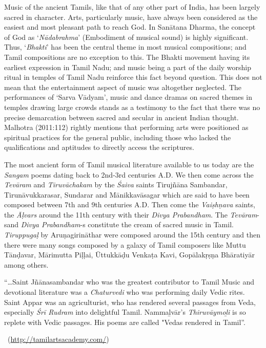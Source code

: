 Music of the ancient Tamils, like that of any other part of India, has been largely sacred in character. Arts, particularly music, have always been considered as the easiest and most pleasant path to reach God. In Sanātana Dharma, the concept of God as ‘\textit{Nādabrahma}’ (Embodiment of musical sound) is highly significant. Thus, ‘\textit{Bhakti}’ has been the central theme in most musical compositions; and Tamil compositions are no exception to this. The Bhakti movement having its earliest expression in Tamil Nadu; and music being a part of the daily worship ritual in temples of Tamil Nadu reinforce this fact beyond question. This does not mean that the entertainment aspect of music was altogether neglected. The performances of ‘Sarva Vādyam’, music and dance dramas on sacred themes in temples drawing large crowds stands as a testimony to the fact that there was no precise demarcation between sacred and secular in ancient Indian thought. Malhotra (2011:112) rightly mentions that performing arts were positioned as spiritual practices for the general public, including those who lacked the qualifications and aptitudes to directly access the scriptures. 

The most ancient form of Tamil musical literature available to us today are the \textit{Sangam} poems dating back to 2nd-3rd centuries A.D. We then come across the \textit{Tevāram} and \textit{Tiruvāchakam} by the \textit{Śaiva} saints Tirujñāna Sambandar, Tirunāvukkarasar, Sundarar and Mānikkavāsagar which are said to have been composed between 7th and 9th centuries A.D. Then come the \textit{Vaiṣhṇava} saints, the \textit{Āḷvars }around the 11th century with their \textit{Divya Prabandham}. The \textit{Tevāram}-sand \textit{Divya Prabandham}-s constitute the cream of sacred music in Tamil. \textit{Tiruppugaḷ} by Aruṇagirināthar were composed around the 15th century and then there were many songs composed by a galaxy of Tamil composers like Muttu Tānḍavar, Mārimutta Piḷḷai, Ūttukkāḍu Venkaṭa Kavi, Gopālakṛṣṇa Bhāratiyār among others.

\begin{myquote}
“…Saint Jñānasambandar who was the greatest contributor to Tamil Music and devotional literature was a \textit{Chaturvedi} who was performing daily Vedic rites. Saint Appar was an agriculturist, who has rendered several passages from Veda, especially \textit{Śrī Rudram} into delightful Tamil. Nammaḻvār's \textit{Thiruvāymoḻi} is so replete with Vedic passages. His poems are called "Vedas rendered in Tamil”.

~\hfill (\url{http://tamilartsacademy.com/})
\end{myquote}

